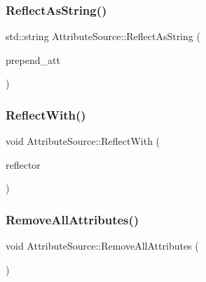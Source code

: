 \subsubsection{\texorpdfstring{Reflect\+As\+String()}{ReflectAsString()}}
{\footnotesize\ttfamily std\+::string Attribute\+Source\+::\+Reflect\+As\+String (\begin{DoxyParamCaption}\item[{\mbox{\hyperlink{ZlibCrc32_8h_a2c212835823e3c54a8ab6d95c652660e}{const}} bool}]{prepend\+\_\+att }\end{DoxyParamCaption})}

\mbox{\label{classlucene_1_1core_1_1util_1_1AttributeSource_a2c1c0eeec6866335e6b44e1fa83a97f9}} 
\subsubsection{\texorpdfstring{Reflect\+With()}{ReflectWith()}}
{\footnotesize\ttfamily void Attribute\+Source\+::\+Reflect\+With (\begin{DoxyParamCaption}\item[{\mbox{\hyperlink{namespacelucene_1_1core_1_1util_a7dbb701adaed055f73fb95eec83da10a}{Attribute\+Reflector}} \&}]{reflector }\end{DoxyParamCaption})}

\mbox{\label{classlucene_1_1core_1_1util_1_1AttributeSource_af3f3c9582d3ac28feaa7a455fbb24b80}} 
\subsubsection{\texorpdfstring{Remove\+All\+Attributes()}{RemoveAllAttributes()}}
{\footnotesize\ttfamily void Attribute\+Source\+::\+Remove\+All\+Attributes (\begin{DoxyParamCaption}{ }\end{DoxyParamCaption})}

